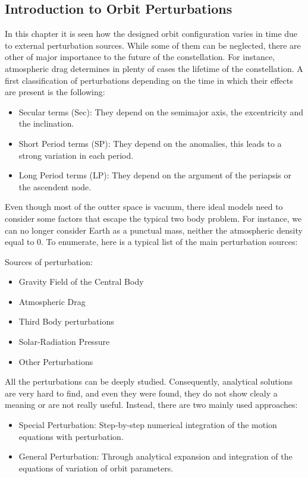 \subsection{Introduction to Orbit Perturbations\cite{Vallado2007}}\label{TypesPerturb}

In this chapter it is seen how the designed orbit configuration varies in time due to external perturbation sources. While some of them can be neglected, there are other of major importance to the future of the constellation. For instance, atmospheric drag determines in plenty of cases the lifetime of the constellation. A first classification of perturbations depending on the time in which their effects are present is the following:

\begin{itemize}
\item Secular terms (Sec): They depend on the semimajor axis, the excentricity and the inclination.
\item Short Period terms (SP): They depend on the anomalies, this leads to a strong variation in each period.
\item Long Period terms (LP): They depend on the argument of the periapsis or the ascendent node.
\end{itemize}

Even though most of the outter space is vacuum, there ideal models need to consider some factors that escape the typical two body problem. For instance, we can no longer consider Earth as a punctual mass, neither the atmospheric density equal to 0. To enumerate, here is a typical list of the main perturbation sources:

Sources of perturbation:
\begin{itemize}
\item Gravity Field of the Central Body
\item Atmospheric Drag
\item Third Body perturbations
\item Solar-Radiation Pressure
\item Other Perturbations
\end{itemize}

All the perturbations can be deeply studied.  Consequently, analytical solutions are very hard to find, and even they were found, they do not show clealy a meaning or are not really useful. Instead, there are two mainly used approaches:
\begin{itemize}
\item Special Perturbation: Step-by-step numerical integration of the motion equations with perturbation.
\item General Perturbation: Through analytical expansion and integration of the equations of variation of orbit parameters.
\end{itemize}

